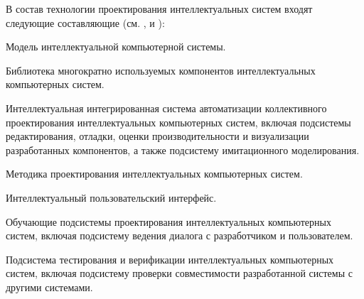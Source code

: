 \begin{partbacktext}
В состав технологии проектирования интеллектуальных систем входят следующие составляющие (см. ,  и ):
\begin{textitemize}
	\item Модель интеллектуальной компьютерной системы.
	\item Библиотека многократно используемых компонентов интеллектуальных компьютерных систем.
	\item Интеллектуальная интегрированная система автоматизации коллективного проектирования интеллектуальных компьютерных систем, включая подсистемы редактирования, отладки, оценки производительности и визуализации разработанных компонентов, а также подсистему имитационного моделирования.
	\item Методика проектирования интеллектуальных компьютерных систем.
	\item Интеллектуальный пользовательский интерфейс.
	\item Обучающие подсистемы проектирования интеллектуальных компьютерных систем, включая подсистему ведения диалога с разработчиком и пользователем.
	\item Подсистема тестирования и верификации интеллектуальных компьютерных систем, включая подсистему проверки совместимости разработанной системы с другими системами.
\end{textitemize}

\end{partbacktext}


%
%
%

